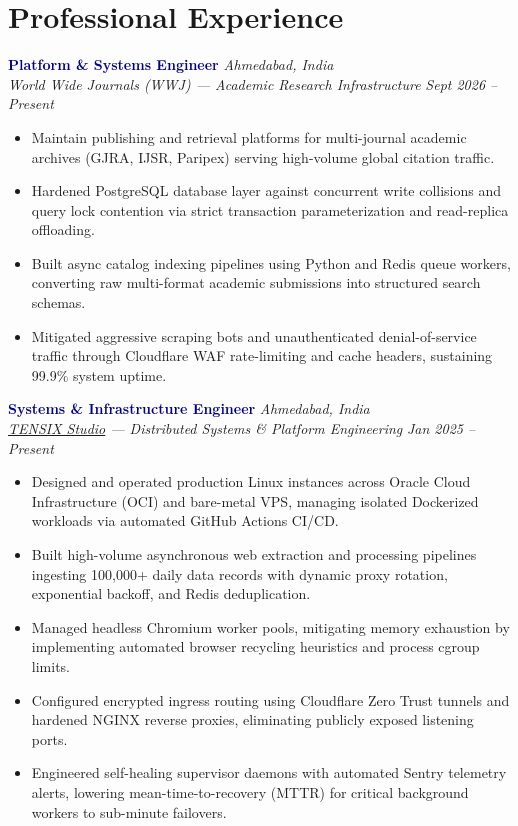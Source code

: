 \documentclass[10pt]{article}
\begin{document}
\section*{Professional Experience}

\noindent\textbf{\textcolor{darkblue}{Platform \& Systems Engineer}} \hfill \textit{\small\color{medgray}Ahmedabad, India}\\
{\small\color{accentblue}\textit{World Wide Journals (WWJ) --- Academic Research Infrastructure}} \hfill \textit{\small\color{medgray}Sept 2026 -- Present}
\begin{itemize}
\item Maintain publishing and retrieval platforms for multi-journal academic archives (GJRA, IJSR, Paripex) serving high-volume global citation traffic.
\item Hardened PostgreSQL database layer against concurrent write collisions and query lock contention via strict transaction parameterization and read-replica offloading.
\item Built async catalog indexing pipelines using Python and Redis queue workers, converting raw multi-format academic submissions into structured search schemas.
\item Mitigated aggressive scraping bots and unauthenticated denial-of-service traffic through Cloudflare WAF rate-limiting and cache headers, sustaining 99.9\% system uptime.
\end{itemize}

\vspace{2pt}
\noindent\textbf{\textcolor{darkblue}{Systems \& Infrastructure Engineer}} \hfill \textit{\small\color{medgray}Ahmedabad, India}\\
{\small\color{accentblue}\textit{\href{https://tensix.in}{TENSIX Studio} --- Distributed Systems \& Platform Engineering}} \hfill \textit{\small\color{medgray}Jan 2025 -- Present}
\begin{itemize}
\item Designed and operated production Linux instances across Oracle Cloud Infrastructure (OCI) and bare-metal VPS, managing isolated Dockerized workloads via automated GitHub Actions CI/CD.
\item Built high-volume asynchronous web extraction and processing pipelines ingesting 100,000+ daily data records with dynamic proxy rotation, exponential backoff, and Redis deduplication.
\item Managed headless Chromium worker pools, mitigating memory exhaustion by implementing automated browser recycling heuristics and process cgroup limits.
\item Configured encrypted ingress routing using Cloudflare Zero Trust tunnels and hardened NGINX reverse proxies, eliminating publicly exposed listening ports.
\item Engineered self-healing supervisor daemons with automated Sentry telemetry alerts, lowering mean-time-to-recovery (MTTR) for critical background workers to sub-minute failovers.
\end{itemize}
\end{document}
